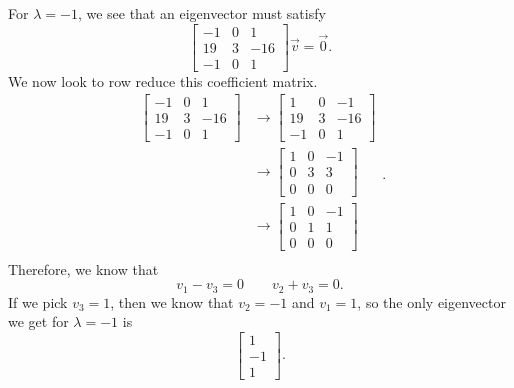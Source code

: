 \documentclass{ximera}
\begin{document}
\begin{exampleSol}
    For $\lambda = -1$, we see that an eigenvector must satisfy
    \[ 
        \begin{bmatrix} 
            -1 & 0 & 1 \\ 
            19 & 3 & -16 \\ 
            -1 & 0 & 1 
        \end{bmatrix} 
        \vec{v} = \vec{0}.
    \] 
    We now look to row reduce this coefficient matrix. 
    \[
        \begin{split}
            \begin{bmatrix} 
                -1 & 0 & 1 \\ 
                19 & 3 & -16 \\ 
                -1 & 0 & 1 
            \end{bmatrix} 
            &\rightarrow 
            \begin{bmatrix} 
                1 & 0 & -1 \\ 
                19 & 3 & -16 \\ 
                -1 & 0 & 1 
            \end{bmatrix} \\
            &\rightarrow 
            \begin{bmatrix} 
                1 & 0 & -1 \\ 
                0 & 3 & 3 \\ 
                0 & 0 & 0 
            \end{bmatrix} \\
            &\rightarrow 
            \begin{bmatrix} 
                1 & 0 & -1 \\ 
                0 & 1 & 1 \\ 
                0 & 0 & 0 
            \end{bmatrix} \\
        \end{split}.
    \]
    Therefore, we know that \[ v_1 - v_3 = 0 \qquad v_2 + v_3 = 0. \] If we pick $v_3 = 1$, then we know that $v_2 = -1$ and $v_1 = 1$, so the only eigenvector we get for $\lambda = -1$ is \[ \begin{bmatrix} 1 \\ -1 \\ 1 \end{bmatrix}. \]
    

\end{exampleSol}
\end{document}
